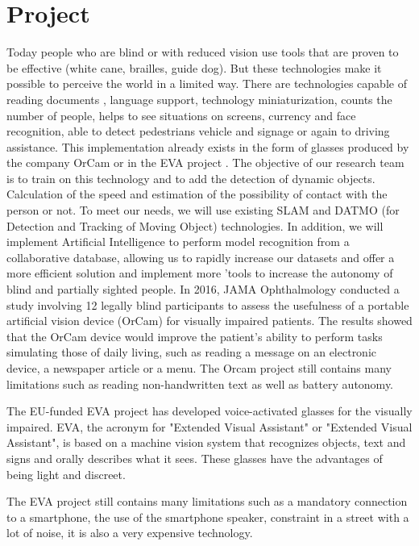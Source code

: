 \documentclass[conference,compsoc]{IEEEtran}
\begin{document}
\section{Project}
Today people who are blind or with reduced vision use tools that are proven to be effective (white cane, brailles, guide dog). But these technologies make it possible to perceive the world in a limited way.
There are technologies capable of reading documents \cite{neto_roberto_cam_reading_2014}, language support, technology miniaturization, counts the number of people, helps to see situations on screens, currency and face recognition, able to detect pedestrians vehicle and signage or again to driving assistance. This implementation already exists in the form of glasses produced by the company OrCam \cite{orcam_2021} or in the EVA project \cite{eva}.
The objective of our research team is to train on this technology and to add the detection of dynamic objects. Calculation of the speed and estimation of the possibility of contact with the person or not.
To meet our needs, we will use existing SLAM and DATMO (for Detection and Tracking of Moving Object) \cite{Pancham2011-11} technologies. In addition, we will implement Artificial Intelligence to perform model recognition from a collaborative database, allowing us to rapidly increase our datasets and offer a more efficient solution and implement more 'tools to increase the autonomy of blind and partially sighted people.
In 2016, JAMA Ophthalmology \cite{adrienne_w.scott_2016} conducted a study involving 12 legally blind participants to assess the usefulness of a portable artificial vision device (OrCam) for visually impaired patients. The results showed that the OrCam device would improve the patient's ability to perform tasks simulating those of daily living, such as reading a message on an electronic device, a newspaper article or a menu.
The Orcam project still contains many limitations such as reading non-handwritten text as well as battery autonomy.
 
The EU-funded EVA project has developed voice-activated glasses for the visually impaired. EVA, the acronym for "Extended Visual Assistant" or "Extended Visual Assistant", is based on a machine vision system that recognizes objects, text and signs and orally describes what it sees. These glasses have the advantages of being light and discreet.

The EVA project still contains many limitations such as a mandatory connection to a smartphone, the use of the smartphone speaker, constraint in a street with a lot of noise, it is also a very expensive technology.
\end{document}
